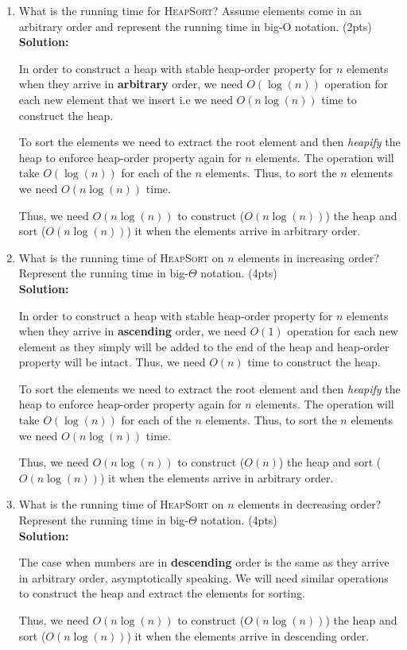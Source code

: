 \documentclass[11pt]{article}
\begin{document}
\begin{enumerate}
\item What is the running time for \textsc{HeapSort}? Assume elements come in an arbitrary order and represent the running time in big-O notation. (2pts) \\
\textbf{Solution:} 

In order to construct a heap with stable heap-order property for $ n $ elements when they arrive in \textbf{arbitrary} order, we need $O(\log(n))$ operation for each new element that we insert i.e we need $O(n\log(n))$ time to construct the heap.

To sort the elements we need to extract the root element and then \textit{heapify} the heap to enforce heap-order property again for $ n $ elements. The operation will take $O(\log(n))$ for each of the $ n $ elements. Thus, to sort the $ n $ elements we need $O(n\log(n))$ time.

Thus, we need $ O(n\log(n)) $ to construct ($ O(n\log(n)) $) the heap and sort ($ O(n\log(n)) $) it when the elements arrive in arbitrary order. \\

\item What is the running time of \textsc{HeapSort} on $n$ elements in increasing order? Represent the running time in big-$\Theta$ notation. (4pts) \\
\textbf{Solution:} 

In order to construct a heap with stable heap-order property for $ n $ elements when they arrive in \textbf{ascending} order, we need $O(1)$ operation for each new element as they simply will be added to the end of the heap and heap-order property will be intact. Thus, we need $O(n)$ time to construct the heap.

To sort the elements we need to extract the root element and then \textit{heapify} the heap to enforce heap-order property again for $ n $ elements. The operation will take $O(\log(n))$ for each of the $ n $ elements. Thus, to sort the $ n $ elements we need $O(n\log(n))$ time.

Thus, we need $ O(n\log(n)) $ to construct ($O(n)$) the heap and sort ($O(n\log(n))$) it when the elements arrive in arbitrary order. \\

\item What is the running time of \textsc{HeapSort} on $n$ elements in decreasing order?  Represent the running time in big-$\Theta$ notation. (4pts) \\
\textbf{Solution:} 

The case when numbers are in \textbf{descending} order is the same as they arrive in arbitrary order, asymptotically speaking. We will need similar operations to construct the heap and extract the elements for sorting.

Thus, we need $ O(n\log(n)) $ to construct ($ O(n\log(n)) $) the heap and sort ($ O(n\log(n)) $) it when the elements arrive in descending order. \\
\end{enumerate}
\end{document}
